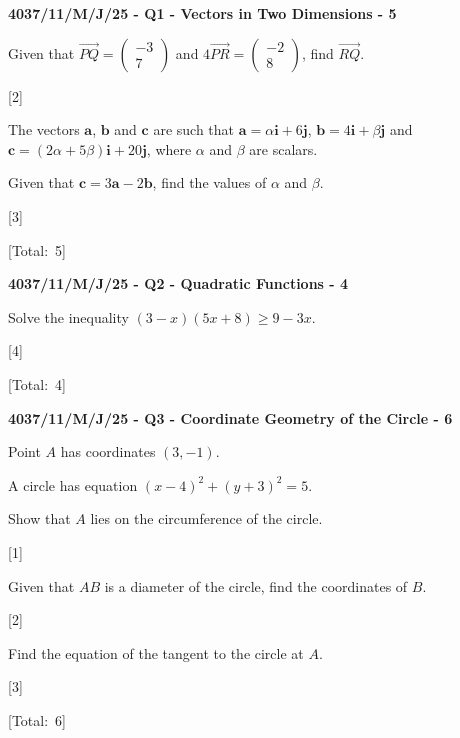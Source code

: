 \documentclass[11pt,a4paper]{article}
\newcommand{\swmarks}{}
\newcommand{\examq}[4]{%
  \gdef\swmarks{#4}%
  \par\addvspace{16pt}\noindent
  {\large\bfseries #1 - Q#2 - #3 - #4}\par\vspace{5pt}%
}
\newcommand{\total}{\par\vspace{2mm}\noindent\hspace*{\fill}[Total:\ \swmarks]\par\vspace{2mm}}
\renewcommand{\markright}[1]{\par\nopagebreak\noindent\hspace*{\fill}\mbox{#1}\par\vspace{1mm}}
\begin{document}
\examq{4037/11/M/J/25}{1}{Vectors in Two Dimensions}{5}
\begin{parts}
  \item Given that $\overrightarrow{PQ}=\begin{pmatrix}-3\\7\end{pmatrix}$ and $4\overrightarrow{PR}=\begin{pmatrix}-2\\8\end{pmatrix}$, find $\overrightarrow{RQ}$.
  \markright{[2]}
  \vspace{5.5cm}

  \item The vectors $\mathbf{a}$, $\mathbf{b}$ and $\mathbf{c}$ are such that $\mathbf{a}=\alpha\mathbf{i}+6\mathbf{j}$, $\mathbf{b}=4\mathbf{i}+\beta\mathbf{j}$ and $\mathbf{c}=(2\alpha+5\beta)\mathbf{i}+20\mathbf{j}$, where $\alpha$ and $\beta$ are scalars.

  Given that $\mathbf{c}=3\mathbf{a}-2\mathbf{b}$, find the values of $\alpha$ and $\beta$.
  \markright{[3]}
  \vspace{10cm}
\end{parts}
\total

\examq{4037/11/M/J/25}{2}{Quadratic Functions}{4}
Solve the inequality $(3-x)(5x+8)\geqslant 9-3x$.
\markright{[4]}
\vspace{18cm}
\total

\examq{4037/11/M/J/25}{3}{Coordinate Geometry of the Circle}{6}
Point $A$ has coordinates $(3,-1)$.

A circle has equation $\left(x-4\right)^{2}+\left(y+3\right)^{2}=5$.
\begin{parts}
  \item Show that $A$ lies on the circumference of the circle.
  \markright{[1]}
  \vspace{2.5cm}

  \item Given that $AB$ is a diameter of the circle, find the coordinates of $B$.
  \markright{[2]}
  \vspace{8.5cm}

  \item Find the equation of the tangent to the circle at $A$.
  \markright{[3]}
  \vspace{8cm}
\end{parts}
\total
\end{document}
